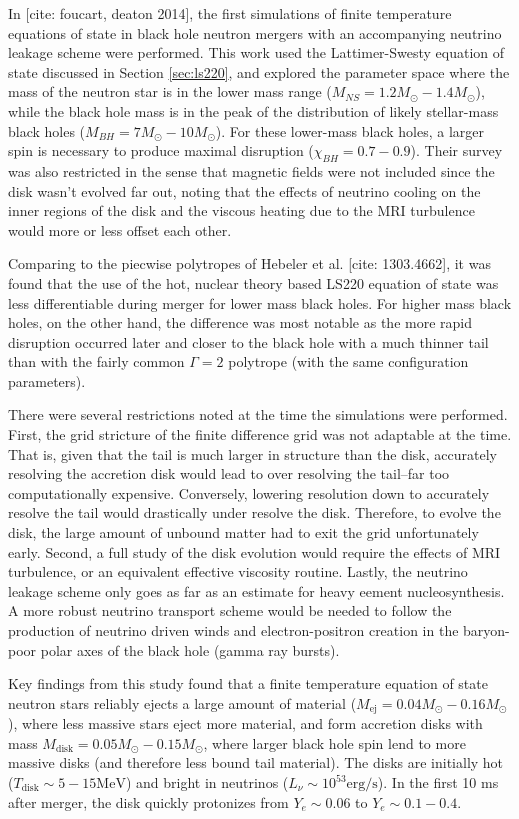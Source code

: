 In [cite: foucart, deaton 2014], the first simulations of finite temperature equations of state in black hole neutron mergers with an accompanying neutrino leakage scheme were performed.  This work used the Lattimer-Swesty equation of state discussed in Section \ref{sec:ls220}, and explored the parameter space where the mass of the neutron star is in the lower mass range ($M_{NS} = 1.2 M_\odot - 1.4 M_\odot$), while the black hole mass is in the peak of the distribution of likely stellar-mass black holes ($M_{BH} = 7 M_\odot - 10 M_\odot$).  For these lower-mass black holes, a larger spin is necessary to produce maximal disruption ($\chi_{BH} = 0.7 - 0.9$).  Their survey was also restricted in the sense that magnetic fields were not included since the disk wasn't evolved far out, noting that the effects of neutrino cooling on the inner regions of the disk and the viscous heating due to the MRI turbulence would more or less offset each other.

Comparing to the piecwise polytropes of Hebeler et al. [cite: 1303.4662], it was found that the use of the hot, nuclear theory based LS220 equation of state was less differentiable during merger for lower mass black holes.  For higher mass black holes, on the other hand, the difference was most notable as the more rapid disruption occurred later and closer to the black hole with a much thinner tail than with the fairly common $\Gamma = 2$ polytrope (with the same configuration parameters).

There were several restrictions noted at the time the simulations were performed.  First, the grid stricture of the finite difference grid was not adaptable at the time.  That is, given that the tail is much larger in structure than the disk, accurately resolving the accretion disk would lead to over resolving the tail--far too computationally expensive.  Conversely, lowering resolution down to accurately resolve the tail would drastically under resolve the disk.  Therefore, to evolve the disk, the large amount of unbound matter had to exit the grid unfortunately early.  Second, a full study of the disk evolution would require the effects of MRI turbulence, or an equivalent effective viscosity routine.   Lastly, the neutrino leakage scheme only goes as far as an estimate for heavy eement nucleosynthesis.  A more robust neutrino transport scheme would be needed to follow the production of neutrino driven winds and electron-positron creation in the baryon-poor polar axes of the black hole (gamma ray bursts).

Key findings from this study found that a finite temperature equation of state neutron stars reliably ejects a large amount of material ($M_\textrm{ej} = 0.04 M_\odot -  0.16 M_\odot$), where less massive stars eject more material, and form accretion disks with mass $M_\textrm{disk} = 0.05 M_\odot -  0.15 M_\odot$, where larger black hole spin lend to more massive disks (and therefore less bound tail material).  The disks are initially hot ($T_\textrm{disk} \sim 5-15 \textrm{MeV}$) and bright in neutrinos ($L_\nu \sim 10^{53} \textrm{erg/s}$).  In the first 10 ms after merger, the disk quickly protonizes from $Y_e \sim 0.06$ to $Y_e \sim 0.1 - 0.4$. 

